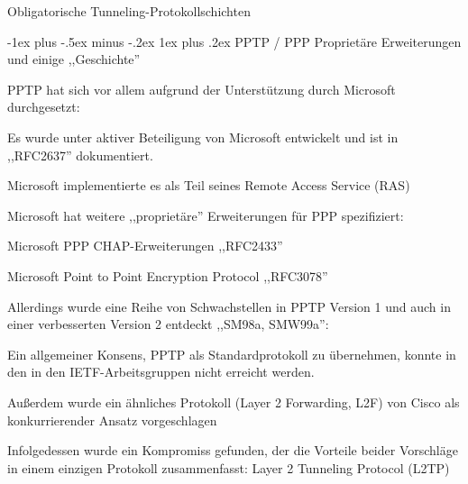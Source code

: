 \documentclass[a4paper]{article}
\makeatletter
\renewcommand{\subsubsection}{\@startsection{subsubsection}{3}{0mm}%
 {-1ex plus -.5ex minus -.2ex}%
 {1ex plus .2ex}%
 {\normalfont\small\bfseries}}
\makeatother
\begin{document}
\begin{multicols}{3}
      Obligatorische Tunneling-Protokollschichten



      \subsubsection{PPTP / PPP Proprietäre Erweiterungen und einige
            ,,Geschichte''}

      \begin{itemize*}
            \item PPTP hat sich vor allem aufgrund der Unterstützung durch Microsoft
            durchgesetzt:
            \begin{itemize*}
                  \item Es wurde unter aktiver Beteiligung von Microsoft entwickelt und ist in ,,RFC2637'' dokumentiert.
                  \item Microsoft implementierte es als Teil seines Remote Access Service (RAS)
            \end{itemize*}
            \item Microsoft hat weitere ,,proprietäre'' Erweiterungen für PPP
            spezifiziert:
            \begin{itemize*}
                  \item Microsoft PPP CHAP-Erweiterungen ,,RFC2433''
                  \item Microsoft Point to Point Encryption Protocol ,,RFC3078''
            \end{itemize*}
            \item Allerdings wurde eine Reihe von Schwachstellen in PPTP Version 1 und
            auch in einer verbesserten Version 2 entdeckt ,,SM98a, SMW99a'':
            \begin{itemize*}
                  \item Ein allgemeiner Konsens, PPTP als Standardprotokoll zu übernehmen, konnte in den in den IETF-Arbeitsgruppen nicht erreicht werden.
                  \item Außerdem wurde ein ähnliches Protokoll (Layer 2 Forwarding, L2F) von Cisco als konkurrierender Ansatz vorgeschlagen
                  \item Infolgedessen wurde ein Kompromiss gefunden, der die Vorteile beider Vorschläge in einem einzigen Protokoll zusammenfasst: Layer 2 Tunneling Protocol (L2TP)
            \end{itemize*}
      \end{itemize*}



\end{multicols}
\end{document}

